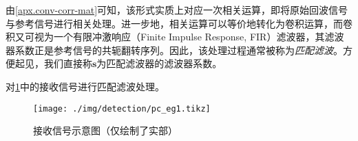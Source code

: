 由\cref{apx.conv-corr-mat}可知，该形式实质上对应一次相关运算，即将原始回波信号与参考信号进行相关处理。进一步地，相关运算可以等价地转化为卷积运算，而卷积又可视为一个有限冲激响应（Finite Impulse Response, FIR）滤波器，其滤波器系数正是参考信号的共轭翻转序列。因此，该处理过程通常被称为\emph{匹配滤波}。方便起见，我们直接称\( \bm{s} \)为匹配滤波器的滤波器系数。

\begin{example}\label{eg_pc}
    对\cref{fig_pc_eg1}中的接收信号进行匹配滤波处理。
    \begin{figure}[htb!]
        \centering
        \texttt{[image: ./img/detection/pc\_eg1.tikz]}
        \caption{接收信号示意图（仅绘制了实部）}
        \label{fig_pc_eg1}
    \end{figure}
\end{example}
